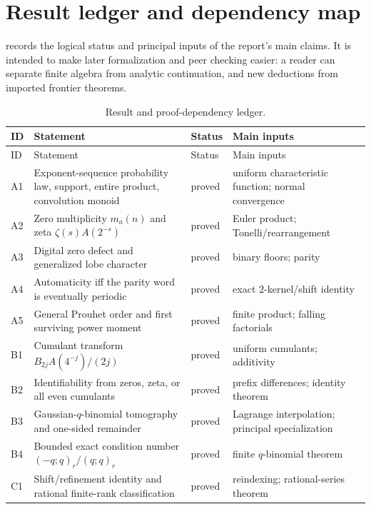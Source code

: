 \documentclass[11pt,oneside]{article}
\numberwithin{equation}{section}
\theoremstyle{definition}
\theoremstyle{remark}
\begin{document}
\section{Result ledger and dependency map}
\label{p1:app:ledger}

 records the logical status and principal inputs of the report's main
claims.  It is intended to make later formalization and peer checking easier: a reader can
separate finite algebra from analytic continuation, and new deductions from imported
frontier theorems.

\begin{longtable}{@{}>{\raggedright\arraybackslash}p{}>{\raggedright\arraybackslash}p{}>{\raggedright\arraybackslash}p{}>{\raggedright\arraybackslash}p{}@{}}
\caption{Result and proof-dependency ledger.}
\label{p1:tab:result-ledger}\\
\toprule
ID & Statement & Status & Main inputs\\
\midrule
\endfirsthead
\toprule
ID & Statement & Status & Main inputs\\
\midrule
\endhead
A1 & Exponent-sequence probability law, support, entire product, convolution monoid & proved & uniform characteristic function; normal convergence\\
A2 & Zero multiplicity $m_a(n)$ and zeta $\zeta(s)A(2^{-s})$ & proved & Euler product; Tonelli/rearrangement\\
A3 & Digital zero defect and generalized lobe character & proved & binary floors; parity\\
A4 & Automaticity iff the parity word is eventually periodic & proved & exact $2$-kernel/shift identity\\
A5 & General Prouhet order and first surviving power moment & proved & finite product; falling factorials\\
B1 & Cumulant transform $B_{2j}A(4^{-j})/(2j)$ & proved & uniform cumulants; additivity\\
B2 & Identifiability from zeros, zeta, or all even cumulants & proved & prefix differences; identity theorem\\
B3 & Gaussian-$q$-binomial tomography and one-sided remainder & proved & Lagrange interpolation; principal specialization\\
B4 & Bounded exact condition number $(-q;q)_r/(q;q)_r$ & proved & finite $q$-binomial theorem\\
C1 & Shift/refinement identity and rational finite-rank classification & proved & reindexing; rational-series theorem\\

\end{longtable}
\end{document}
